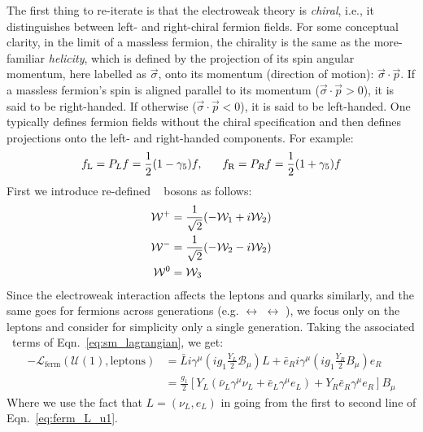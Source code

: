 The first thing to re-iterate is that the electroweak theory is \textit{chiral}, i.e., it distinguishes
between left- and right-chiral fermion fields. For some conceptual clarity, in the limit of
a massless fermion, the chirality is the same as the more-familiar \textit{helicity}, which
is defined by the projection of its spin angular momentum, here labelled as $\vec{\sigma}$, onto its momentum (direction of motion): $\vec{\sigma}\cdot \vec{p}$. If a massless fermion's spin
is aligned parallel to its momentum ($\vec{\sigma}\cdot \vec{p} >0$), it is said to be right-handed. If otherwise ($\vec{\sigma}\cdot \vec{p} <0$), it is said to be left-handed. One typically defines
fermion fields without the chiral specification and then defines projections onto the left-
and right-handed components. For example:
\begin{equation*}
	f_{\text{L}} = P_L f = \frac{1}{2}(1- \gamma_5)f, \hspace{0.6cm} f_{\text{R}} = P_R f = \frac{1}{2}(1+\gamma_5)f
	\label{eq:chiral_projection}
\end{equation*}
First we introduce re-defined \fieldW~ bosons as follows:
\begin{align}
	\mathcal{W}^+ &= \frac{1}{\sqrt{2}} ( -\mathcal{W}_1 + i\mathcal{W}_2)\notag \\
	\mathcal{W}^- &= \frac{1}{\sqrt{2}} ( -\mathcal{W}_2 - i\mathcal{W}_2) \label{eq:w_redefine} \\ 
	\mathcal{W}^0 &= \mathcal{W}_3 \notag
\end{align}
Since the electroweak interaction affects the leptons and quarks similarly, and the same goes for
fermions across generations (e.g. \fieldEl $\leftrightarrow$ \fieldMul $\leftrightarrow$ \fieldTaul),
we focus only on the leptons and consider for simplicity only a single generation.
Taking the associated \Uone~terms of Eqn.~\ref{eq:sm_lagrangian}, we get:
\begin{align}
    -\mathcal{L}_{\text{ferm}}(\mathcal{U}(1), \text{leptons}) &= \bar{L} i \gamma^{\mu} (i g_1 \frac{Y_L}{2} \mathcal{B}_{\mu})L + \bar{e}_R i \gamma^{\mu} (i g_1 \frac{Y_R}{2} B_{\mu}) e_R \nonumber \\
    &= \frac{g_1}{2} [ Y_L ( \bar{\nu}_L \gamma^{\mu} \nu_L + \bar{e}_L \gamma^{\mu} e_L) + Y_R \bar{e}_R \gamma^{\mu} e_R ] B_{\mu}
    \label{eq:ferm_L_u1}
\end{align}
Where we use the fact that $L = (\nu_L, e_L)$ in going from the first to second line of Eqn.~\ref{eq:ferm_L_u1}.
